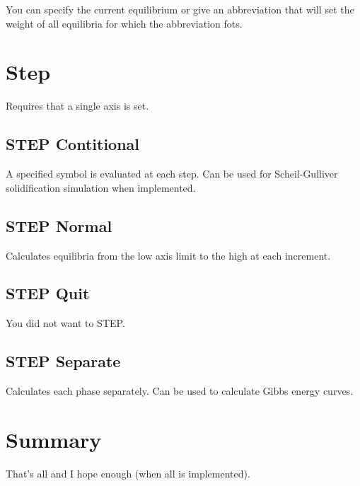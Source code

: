 \documentclass[12pt]{article}
\begin{document}
You can specify the current equilibrium or give an abbreviation that
will set the weight of all equilibria for which the abbreviation fots.

\section{Step }

Requires that a single axis is set.

\subsection{STEP Contitional}

A specified symbol is evaluated at each step.  Can be used for
Scheil-Gulliver solidification simulation when implemented.

\subsection{STEP Normal}

Calculates equilibria from the low axis limit to the high at each
increment.  

\subsection{STEP Quit}

You did not want to STEP.

\subsection{STEP Separate}

Calculates each phase separately.  Can be used to calculate Gibbs
energy curves.


\section{Summary }

That's all and I hope enough (when all is implemented).
\end{document}
